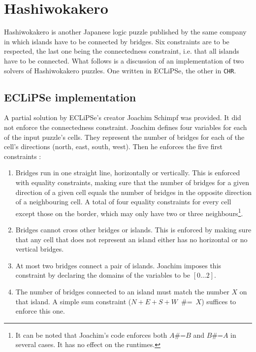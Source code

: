 \section{Hashiwokakero}

Hashiwokakero is another Japanese logic puzzle published by the same company in which islands have to be connected by bridges. Six constraints are to be respected, the last one being the connectedness constraint, i.e. that all islands have to be connected. What follows is a discussion of an implementation of two solvers of Hashiwokakero puzzles. One written in ECLiPSe, the other in \texttt{CHR}.

\subsection{ECLiPSe implementation}

A partial solution by ECLiPSe's creator Joachim Schimpf was provided. It did not enforce the connectedness constraint. Joachim defines four variables for each of the input puzzle's cells. They represent the number of bridges for each of the cell's directions (north, east, south, west). Then he enforces the five first constraints :
\begin{enumerate}
\item[1-2.] Bridges run in one straight line, horizontally or vertically. This is enforced with equality constraints, making sure that the number of bridges for a given direction of a given cell equals the number of bridges in the opposite direction of a neighbouring cell. A total of four equality constraints for every cell except those on the border, which may only have two or three neighbours\footnote{It can be noted that Joachim's code enforces both $A$\#=$B$ and $B$\#=$A$ in several cases. It has no effect on the runtimes.}.
\item[3.] Bridges cannot cross other bridges or islands. This is enforced by making sure that any cell that does not represent an island either has no horizontal or no vertical bridges.
\item[4.] At most two bridges connect a pair of islands. Joachim imposes this constraint by declaring the domains of the variables to be $[0\dots 2]$.
\item[5.] The number of bridges connected to an island must match the number $X$ on that island. A simple sum constraint ($N+E+S+W$\ \#=\ $X$) suffices to enforce this one.
\end{enumerate}

